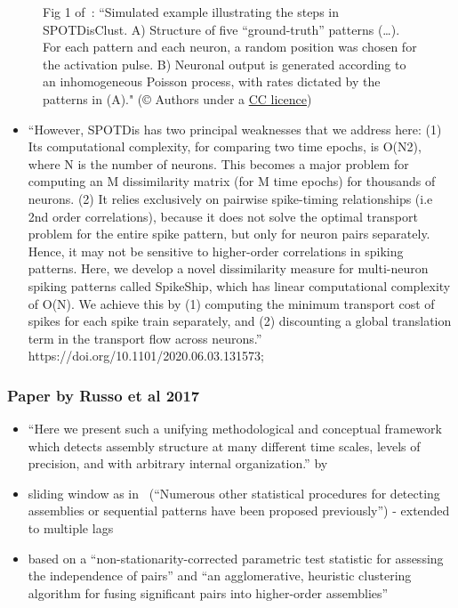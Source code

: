 \documentclass[brainsci, %
               review,submit,pdftex,moreauthors%
               ]{Definitions/mdpi}
\begin{document}
\begin{figure}
\centering
\caption{Fig 1 of~\citep{grossberger_unsupervised_2018}: ``Simulated example illustrating the steps in SPOTDisClust. A) Structure of five ``ground-truth'' patterns (\ldots). For each pattern and each neuron, a random position was chosen for the activation pulse. B) Neuronal output is generated according to an inhomogeneous Poisson process, with rates dictated by the patterns in (A)." (© Authors under a \href{https://journals.plos.org/ploscompbiol/article?id=10.1371/journal.pcbi.1006283}{CC licence})}\label{fig:G2018-1}
\end{figure}

\begin{itemize}
 \item
  ``However, SPOTDis has two principal weaknesses that we address here: (1) Its computational complexity, for comparing two time epochs, is O(N2), where N is the number of neurons. This becomes a major problem for computing an M dissimilarity matrix (for M time epochs) for thousands of neurons. (2) It relies exclusively on pairwise spike-timing relationships (i.e 2nd order correlations), because it does not solve the optimal transport problem for the entire spike pattern, but only for neuron pairs separately. Hence, it may not be sensitive to higher-order correlations in spiking
  patterns.
  Here, we develop a novel dissimilarity measure for multi-neuron spiking patterns called SpikeShip, which has linear computational complexity of O(N). We achieve this by (1) computing the minimum transport cost of spikes for each spike train separately, and (2) discounting a global translation term in the transport flow across neurons.''
  https://doi.org/10.1101/2020.06.03.131573;
\end{itemize}

\subsubsection{Paper by Russo et al 2017~\citep{russo_cell_2017}}\label{paper-by-russo-et-al-2017-russo2017}
\begin{itemize}
 \item
  ``Here we present such a unifying methodological and conceptual framework which detects assembly structure at many different time scales, levels of precision, and with arbitrary internal organization.'' by~\citep{russo_cell_2017}
\item
  sliding window as in~\citep{grun_unitary_2002} (``Numerous other statistical procedures for detecting assemblies or sequential patterns have been proposed previously'') - extended to multiple lags~\citep{torre_synchronous_2016}
\item
  based on a ``non-stationarity-corrected parametric test statistic for assessing the independence of pairs'' and ``an agglomerative, heuristic clustering algorithm for fusing significant pairs into higher-order assemblies''
\end{itemize}
\end{document}
